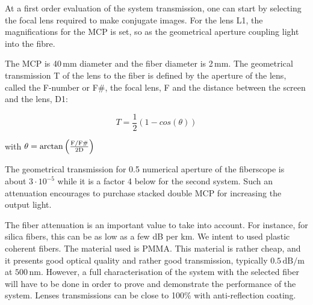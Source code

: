 \begin{refsection}
  At a first order evaluation of the system transmission, one can start by selecting the focal lens required to make conjugate images. For the lens L1, the magnifications for the MCP is set, so as the geometrical aperture coupling light into the fibre.
  
  The MCP is 40\,mm diameter and the fiber diameter is 2\,mm. The geometrical transmission T of the lens to the fiber is defined by the aperture of the lens, called the F-number or F\#, the focal lens, F and the distance between the screen and the lens, D1:
  
  \begin{equation}
  T=\frac{1}{2} \left(1 - cos\left(\theta\right)\right) 
  \end{equation}
  
  with $\theta = \rm arctan\left (\frac{F/F\#}{2D}  \right )$ 
  
  The geometrical transmission for 0.5 numerical aperture of the fiberscope is about $3 \cdot 10^{-5}$ while it is a factor 4 below for the second system. Such an attenuation encourages to purchase stacked double MCP for increasing the output light.
  
  The fiber attenuation is an important value to take into account. For instance, for silica fibers, this can be as low as a few dB per km. We intent to used plastic coherent fibers. The material used is PMMA. This material is rather cheap, and it presents good optical quality and rather good transmission, typically $0.5\,\mathrm{dB/m}$ at $500\,\mathrm{nm}$. However, a full characterisation of the system with the selected fiber will have to be done in order to prove and demonstrate the performance of the system. Lenses transmissions can be close to 100\% with anti-reflection coating.

  


\end{refsection}